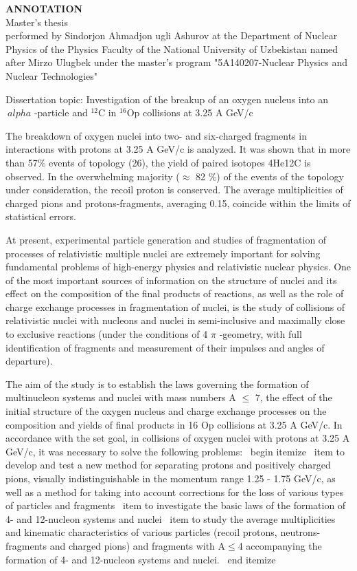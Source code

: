 \documentclass[fontsize=14pt]{scrarticle}
\begin{document}
\newpage
	\thispagestyle{plain}
\begin{center}
    \large
    \textbf{ANNOTATION}\\
         Master's thesis\\
         performed by Sindorjon Ahmadjon ugli Ashurov at the Department of Nuclear Physics of the Physics Faculty of the National University of Uzbekistan named after Mirzo Ulugbek under the master's program "5A140207-Nuclear Physics and Nuclear Technologies"

    Dissertation topic: Investigation of the breakup of an oxygen nucleus into an $ \ alpha $ -particle and $^{12}$C in $^{16}$Op collisions at 3.25 A GeV/c
\end{center}
    The breakdown of oxygen nuclei into two- and six-charged fragments in interactions with protons at 3.25 A GeV/c is analyzed. It was shown that in more than 57\% events of topology (26), the yield of paired isotopes 4He12C is observed. In the overwhelming majority ($\approx$ 82 \%) of the events of the topology under consideration, the recoil proton is conserved. The average multiplicities of charged pions and protons-fragments, averaging 0.15, coincide within the limits of statistical errors.
   
   At present, experimental particle generation and studies of fragmentation of processes of relativistic multiple nuclei are extremely important for solving fundamental problems of high-energy physics and relativistic nuclear physics. One of the most important sources of information on the structure of nuclei and its effect on the composition of the final products of reactions, as well as the role of charge exchange processes in fragmentation of nuclei, is the study of collisions of relativistic nuclei with nucleons and nuclei in semi-inclusive and maximally close to exclusive reactions (under the conditions of 4 $ \pi$ -geometry, with full identification of fragments and measurement of their impulses and angles of departure).
   
   The aim of the study is to establish the laws governing the formation of multinucleon systems and nuclei with mass numbers A $\le$ 7, the effect of the initial structure of the oxygen nucleus and charge exchange processes on the composition and yields of final products in 16 Op collisions at 3.25 A GeV/c. In accordance with the set goal, in collisions of oxygen nuclei with protons at 3.25 A GeV/c, it was necessary to solve the following problems:
\ begin {itemize}
    \ item to develop and test a new method for separating protons and positively charged pions, visually indistinguishable in the momentum range 1.25 - 1.75 GeV/c, as well as a method for taking into account corrections for the loss of various types of particles and fragments
    \ item to investigate the basic laws of the formation of 4- and 12-nucleon systems and nuclei
    \ item to study the average multiplicities and kinematic characteristics of various particles (recoil protons, neutrons-fragments and charged pions) and fragments with A$\le$4 accompanying the formation of 4- and 12-nucleon systems and nuclei.
    \ end {itemize}
\end{document}
